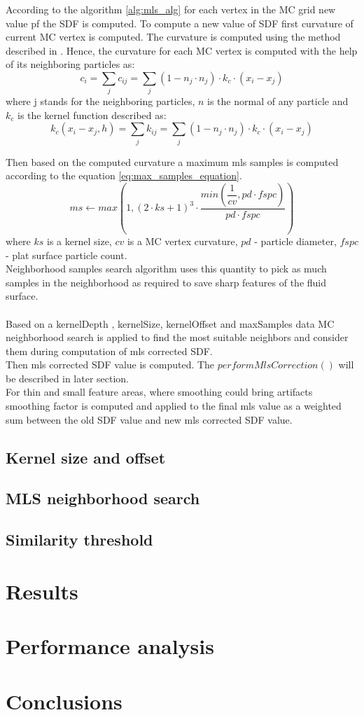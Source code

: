 According to the algorithm \ref{alg:mls_alg} for each vertex in the MC grid new value pf the SDF is computed. To compute a new value of SDF first curvature of current MC vertex is computed. The curvature is computed using the method described in \cite{CurvatureComputation}. Hence, the curvature for each MC vertex is computed  with the help of its neighboring particles as:
\begin{equation}
	c_i = \sum_j{c_{ij}} = \sum_j(1 - n_j \cdot n_j)\cdot k_c \cdot (x_i - x_j)
\end{equation}
where j stands for the neighboring particles, $n$ is the normal of any particle and $k_c$ is the kernel function described as:
\begin{equation}
	k_c(x_i - x_j, h) = \sum_j{k_{ij}} = \sum_j(1 - n_j \cdot n_j)\cdot k_c \cdot (x_i - x_j)
\end{equation}

Then based on the computed curvature a maximum mls samples is computed according to the equation \ref{eq:max_samples_equation}.
\begin{equation}
	ms \gets max(1, (2 \cdot ks + 1)^3 \cdot
					\dfrac{min(\dfrac{1}{cv}, pd \cdot fspc)}{pd \cdot fspc})
	\label{eq:max_samples_equation}
\end{equation}
where $ks$ is a kernel size, $cv$ is a MC vertex curvature,  $pd$ - particle diameter, $fspc$  - plat surface particle count.\\ 
Neighborhood samples search algorithm uses this quantity to pick as much samples in the neighborhood as required to save sharp features of the fluid surface.\\
\\Based on a kernelDepth , kernelSize, kernelOffset and maxSamples data MC neighborhood search is applied to find the most suitable neighbors and consider them during computation of mls corrected SDF.\\
Then mls corrected SDF value is computed. The  $performMlsCorrection()$ will be described in later section.\\
For thin and small feature areas, where smoothing could bring artifacts smoothing factor is computed and applied to the final mls value as a weighted sum between the old SDF value and new mls corrected SDF value.


\subsection{Kernel size and offset}
\subsection{MLS neighborhood search}
\subsection{Similarity threshold}
\section{Results}
\section{Performance analysis}
\section{Conclusions}
